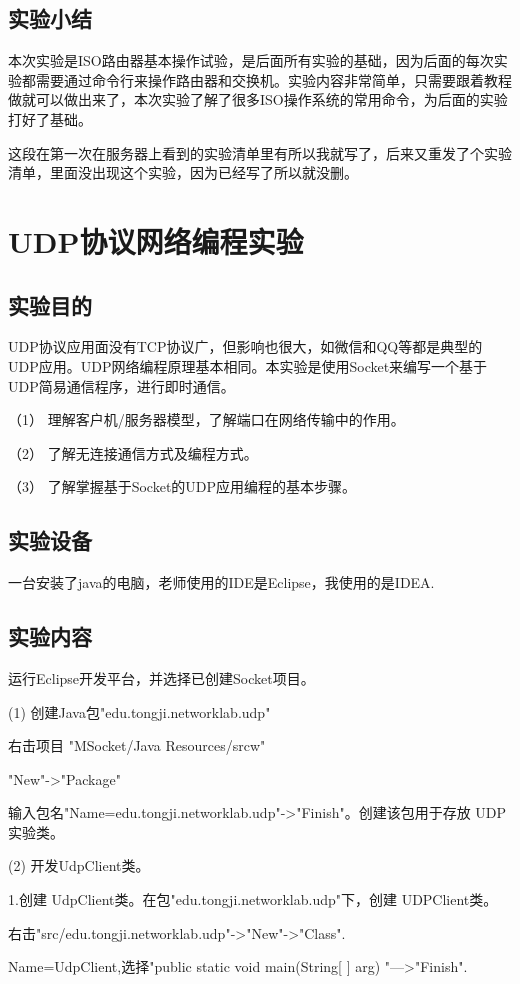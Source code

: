 \documentclass[lang=cn,11pt,a4paper,cite=authoryear]{elegantpaper}
\begin{document}
\subsection{实验小结}
本次实验是ISO路由器基本操作试验，是后面所有实验的基础，因为后面的每次实验都需要通过命令行来操作路由器和交换机。实验内容非常简单，只需要跟着教程做就可以做出来了，本次实验了解了很多ISO操作系统的常用命令，为后面的实验打好了基础。

这段在第一次在服务器上看到的实验清单里有所以我就写了，后来又重发了个实验清单，里面没出现这个实验，因为已经写了所以就没删。

\section{UDP协议网络编程实验}
\subsection{实验目的}
UDP协议应用面没有TCP协议广，但影响也很大，如微信和QQ等都是典型的UDP应用。UDP网络编程原理基本相同。本实验是使用Socket来编写一个基于UDP简易通信程序，进行即时通信。

（1）	理解客户机/服务器模型，了解端口在网络传输中的作用。

（2）	了解无连接通信方式及编程方式。

（3）	了解掌握基于Socket的UDP应用编程的基本步骤。 

\subsection{实验设备}
一台安装了java的电脑，老师使用的IDE是Eclipse，我使用的是IDEA.
\subsection{实验内容}
运行Eclipse开发平台，并选择已创建Socket项目。

(1)	创建Java包"edu.tongji.networklab.udp"

右击项目 "MSocket/Java Resources/srcw"

"New"->"Package"

输入包名"Name=edu.tongji.networklab.udp"->"Finish"。创建该包用于存放 UDP 实验类。

(2)	开发UdpClient类。

	1.创建 UdpClient类。在包"edu.tongji.networklab.udp"下，创建 UDPClient类。 

右击"src/edu.tongji.networklab.udp"->"New"->"Class".

Name=UdpClient,选择"public static void main(String[ ] arg) "—>"Finish".
\end{document}

